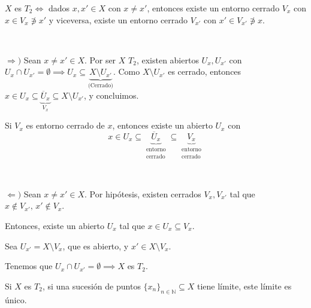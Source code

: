 \begin{prop}
    $X$ es $T_2 \iff$ dados $x, x' \in X$ con $x \ne x'$, entonces existe un entorno cerrado $V_x$ con $x \in V_x \not\ni x'$ y viceversa, existe un entorno cerrado $V_{x'}$ con $x' \in V_{x'} \not\ni x$.
\end{prop}

\begin{dem} \, 
    
    $\Rightarrow)$ Sean $x \ne x' \in X$. Por ser $X$ $T_2$, existen abiertos $U_x, U_{x'}$ con $U_x \cap U_{x'} = \emptyset \implies U_x \subseteq \underbrace{X \setminus U_{x'}}_{\text{(Cerrado)}}$. Como $X \setminus U_{x'}$ es cerrado, entonces $x \in U_x \subseteq \underbrace{\overline{U}_x}_{V_x} \subseteq X \setminus U_{x'}$, y concluimos.
\end{dem}

\begin{obs}
    Si $V_x$ es entorno cerrado de $x$, entonces existe un abierto $U_x$ con $$x \in U_x \subseteq \underbrace{\overline{U}_x}_{\substack{\text{entorno} \\ \text{cerrado}}} \subseteq \underbrace{V_x}_{\substack{\text{entorno} \\ \text{cerrado}}}$$
\end{obs}

\begin{dem} \, 

        $\Leftarrow)$ Sean $x \ne x' \in X$. Por hipótesis, existen cerrados $V_x, V_{x'}$ tal que $x \notin V_{x'}, \, x' \notin V_x$.
        
        Entonces, existe un abierto $U_x$ tal que $x \in U_x \subseteq V_x$.
        
        Sea $U_{x'} = X \setminus V_x$, que es abierto, y $x' \in X \setminus V_x$.
        
        Tenemos que $U_x \cap U_{x'} = \emptyset \implies X$ es $T_2$.
\end{dem}

\begin{prop}
    Si $X$ es $T_2$, si una sucesión de puntos $\{x_n\}_{n \in \mathbb{N}} \subseteq X$ tiene límite, este límite es único.
\end{prop}

